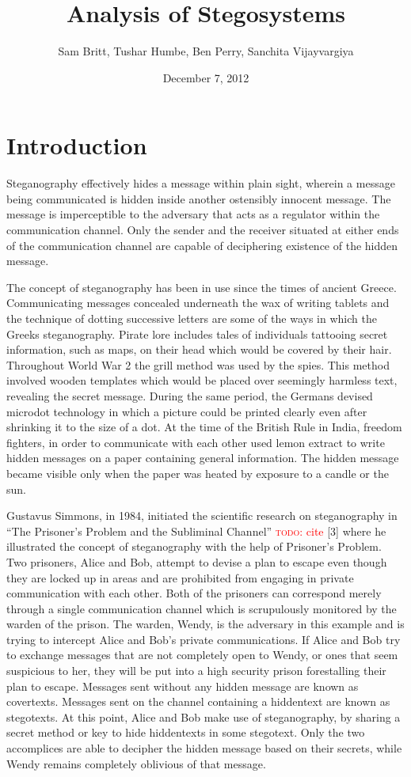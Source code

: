 \documentclass[11pt]{article}
\title{Analysis of Stegosystems}
\author{Sam Britt, Tushar Humbe, Ben Perry, Sanchita Vijayvargiya}
\date{December 7, 2012}
\newcommand\todo[1]{\textcolor{red}{\textsc{todo}: #1}}
\begin{document}
\maketitle

\section{Introduction}
Steganography effectively hides a message within plain sight, wherein
a message being communicated is hidden inside another ostensibly
innocent message. The message is imperceptible to the adversary that
acts as a regulator within the communication channel. Only the sender
and the receiver situated at either ends of the communication channel
are capable of deciphering existence of the hidden message.

The concept of steganography has been in use since the times of
ancient Greece. Communicating messages concealed underneath the wax of
writing tablets and the technique of dotting successive letters are
some of the ways in which the Greeks steganography. Pirate lore
includes tales of individuals tattooing secret information, such as
maps, on their head which would be covered by their hair. Throughout
World War 2 the grill method was used by the spies. This method
involved wooden templates which would be placed over seemingly
harmless text, revealing the secret message. During the same period,
the Germans devised microdot technology in which a picture could be
printed clearly even after shrinking it to the size of a dot.  At the
time of the British Rule in India, freedom fighters, in order to
communicate with each other used lemon extract to write hidden
messages on a paper containing general information. The hidden message
became visible only when the paper was heated by exposure to a candle
or the sun.

Gustavus Simmons, in 1984, initiated the scientific research on
steganography in ``The Prisoner's Problem and the Subliminal
Channel'' \todo{cite} [3] where he illustrated the concept of
steganography with the
help of Prisoner's Problem. Two prisoners, Alice and Bob, attempt to
devise a plan to escape even though they are locked up in areas and
are prohibited from engaging in private communication with each other.
Both of the prisoners can correspond merely through a single
communication channel which is scrupulously monitored by the warden of
the prison. The warden, Wendy, is the adversary in this example and is
trying to intercept Alice and Bob's private communications. If Alice
and Bob try to exchange messages that are not completely open to
Wendy, or ones that seem suspicious to her, they will be put into a
high security prison forestalling their plan to escape. Messages sent
without any hidden message are known as covertexts. Messages sent on
the channel containing a hiddentext are known as stegotexts. At this
point, Alice and Bob make use of steganography, by sharing a secret
method or key to hide hiddentexts in some stegotext. Only the two
accomplices are able to decipher the hidden message based on their
secrets, while Wendy remains completely oblivious of that message.
\end{document}
